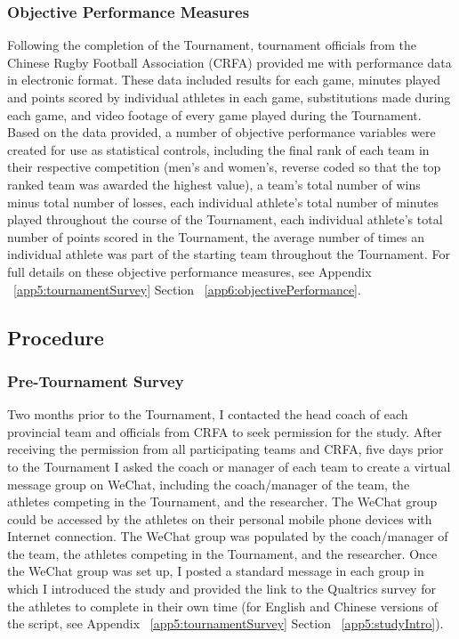 \subsubsection{\label{app5:objectivePerformance}Objective Performance Measures}
Following the completion of the Tournament, tournament officials from the Chinese Rugby Football Association (CRFA) provided me with performance data in electronic format. These data included results for each game, minutes played and points scored by individual athletes in each game, substitutions made during each game, and video footage of every game played during the Tournament.  Based on the data provided, a number of objective performance variables were created for use as statistical controls, including the final rank of each team in their respective competition (men's and women's, reverse coded so that the top ranked team was awarded the highest value), a team's total number of wins minus total number of losses, each individual athlete's total number of minutes played throughout the course of the Tournament, each individual athlete's total number of points scored in the Tournament, the average number of times an individual athlete was part of the starting team throughout the Tournament. For full details on these objective performance measures, see Appendix ~\ref{app5:tournamentSurvey} Section ~\ref{app6:objectivePerformance}.




\subsection{Procedure}

\subsubsection{Pre-Tournament Survey}
Two months prior to the Tournament, I contacted the head coach of each provincial team and officials from CRFA to seek permission for the study.  After receiving the permission from all participating teams and CRFA, five days prior to the Tournament I asked the coach or manager of each team to create a virtual message group on WeChat, including the coach/manager of the team, the athletes competing in the Tournament, and the researcher.  The WeChat group could be accessed by the athletes on their personal mobile phone devices with Internet connection. The WeChat group was populated by the coach/manager of the team, the athletes competing in the Tournament, and the researcher. Once the WeChat group was set up, I posted a standard message in each group in which I introduced the study and provided the link to the Qualtrics survey for the athletes to complete in their own time (for English and Chinese versions of the script, see Appendix ~\ref{app5:tournamentSurvey} Section ~\ref{app5:studyIntro}).

